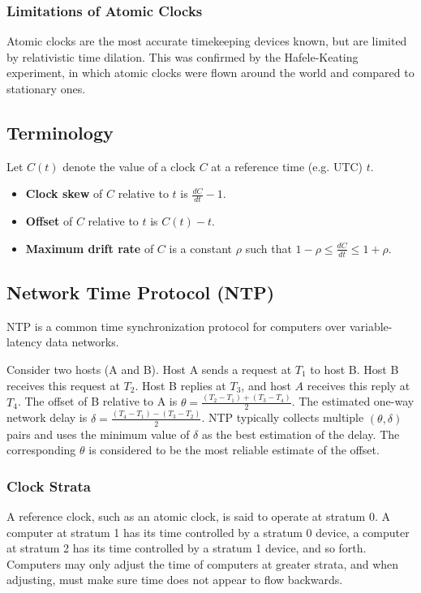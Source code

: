 \documentclass[12pt,titlepage]{article}
\begin{document}
      \subsubsection{Limitations of Atomic Clocks}
        Atomic clocks are the most accurate timekeeping devices known, but are limited by relativistic time dilation. This was confirmed by the Hafele-Keating
        experiment, in which atomic clocks were flown around the world and compared to stationary ones.

    \subsection{Terminology}
      Let $C(t)$ denote the value of a clock $C$ at a reference time (e.g. UTC) $t$.
        \begin{itemize}
          \item \textbf{Clock skew} of $C$ relative to $t$ is $\frac{dC}{dt} - 1$.
          \item \textbf{Offset} of $C$ relative to $t$ is $C(t) - t$.
          \item \textbf{Maximum drift rate} of $C$ is a constant $\rho$ such that $1 - \rho \leq \frac{dC}{dt} \leq 1 + \rho$.
        \end{itemize}

    \subsection{Network Time Protocol (NTP)}
      NTP is a common time synchronization protocol for computers over variable-latency data networks.

      Consider two hosts (A and B). Host A sends a request at $T_1$ to host B. Host B receives this request at $T_2$. Host B replies at $T_3$, and host $A$
      receives this reply at $T_4$. The offset of B relative to A is $\theta = \frac{(T_2 - T_1) + (T_3 - T_4)}{2}$. The estimated one-way network delay is
      $\delta = \frac{(T_4 - T_1) - (T_3 - T_2)}{2}$. NTP typically collects multiple $(\theta, \delta)$ pairs and uses the minimum value of $\delta$ as the
      best estimation of the delay. The corresponding $\theta$ is considered to be the most reliable estimate of the offset.

      \subsubsection{Clock Strata}
        A reference clock, such as an atomic clock, is said to operate at stratum 0. A computer at stratum 1 has its time controlled by a stratum 0 device, a
        computer at stratum 2 has its time controlled by a stratum 1 device, and so forth. Computers may only adjust the time of computers at greater strata, and
        when adjusting, must make sure time does not appear to flow backwards.
\end{document}

